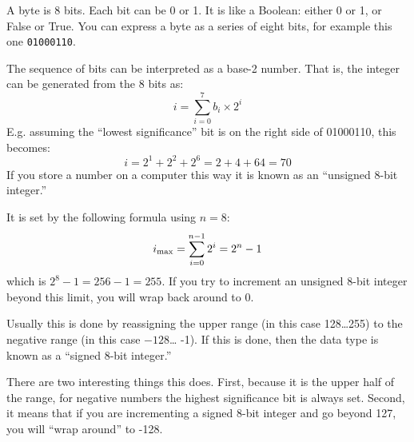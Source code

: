 
\begin{answer}
  A byte is 8 bits. Each bit can be 0 or 1. It is like a Boolean:
  either 0 or 1, or False or True. You can express a byte as a series
  of eight bits, for example this one {\tt 01000110}.
\end{answer}


\begin{answer}
  The sequence of bits can be interpreted as a base-2 number. That is,
  the integer can be generated from the 8 bits as:
\begin{equation}
i = \sum_{i=0}^7 b_i \times 2^i
\end{equation}
E.g. assuming the ``lowest significance'' bit is on the right side of
01000110, this becomes:
\begin{equation}
i = 2^1 + 2^2 + 2^6 = 2 + 4 + 64 = 70
\end{equation}
If you store a number on a computer this way it is known as an
``unsigned 8-bit integer.''
\end{answer}


\begin{answer}
  It is set by the following formula using $n=8$:
  \begin{equation}
    i_{\rm max} = \sum_{i=0}^{n-1} 2^i = 2^n - 1
  \end{equation}
  which is $2^8 - 1 = 256 - 1 = 255$. If you try to increment an
  unsigned 8-bit integer beyond this limit, you will wrap back around to
  0.
\end{answer}


\begin{answer}
  Usually this is done by reassigning the upper range (in this
  case 128\ldots 255) to the negative range (in this case $-128$\ldots
  -1). If this is done, then the data type is known as a ``signed
  8-bit integer.''

  There are two interesting things this does. First, because it is the
  upper half of the range, for negative numbers the highest
  significance bit is always set. Second, it means that if you are
  incrementing a signed 8-bit integer and go beyond 127, you will
  ``wrap around'' to -128.
\end{answer}

